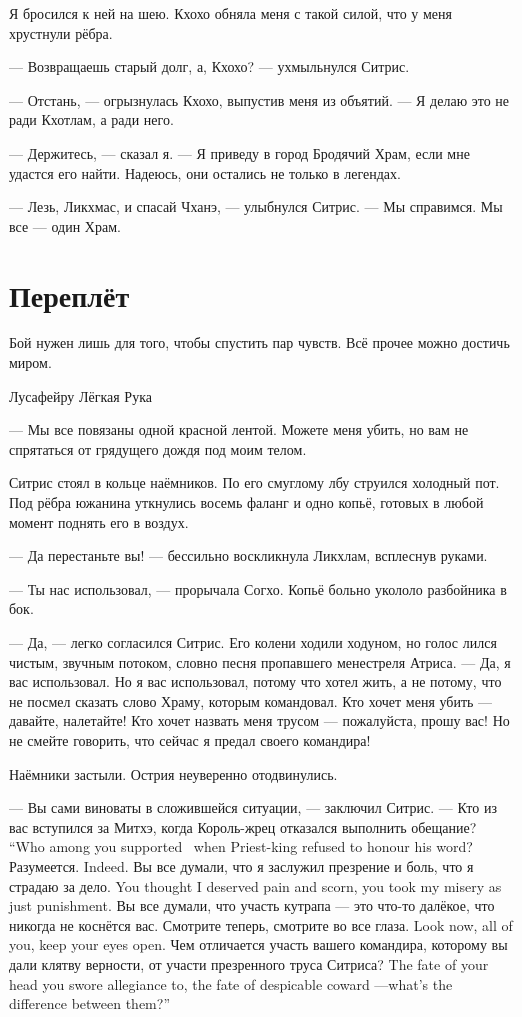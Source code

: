 Я бросился к ней на шею.
Кхохо обняла меня с такой силой, что у меня хрустнули рёбра.

--- Возвращаешь старый долг, а, Кхохо? --- ухмыльнулся Ситрис.

--- Отстань, --- огрызнулась Кхохо, выпустив меня из объятий.
--- Я делаю это не ради Кхотлам, а ради него.

--- Держитесь, --- сказал я.
--- Я приведу в город Бродячий Храм, если мне удастся его найти.
Надеюсь, они остались не только в легендах.

--- Лезь, Ликхмас, и спасай Чханэ, --- улыбнулся Ситрис.
--- Мы справимся.
Мы все --- один Храм.

\section{Переплёт}

\epigraph
{Бой нужен лишь для того, чтобы спустить пар чувств.
Всё прочее можно достичь миром.}
{Лусафейру Лёгкая Рука}

--- Мы все повязаны одной красной лентой.
Можете меня убить, но вам не спрятаться от грядущего дождя под моим телом.

Ситрис стоял в кольце наёмников.
По его смуглому лбу струился холодный пот.
Под рёбра южанина уткнулись восемь фаланг и одно копьё, готовых в любой момент поднять его в воздух.

--- Да перестаньте вы! --- бессильно воскликнула Ликхлам, всплеснув руками.

--- Ты нас использовал, --- прорычала Согхо.
Копьё больно укололо разбойника в бок.

--- Да, --- легко согласился Ситрис.
Его колени ходили ходуном, но голос лился чистым, звучным потоком, словно песня пропавшего менестреля Атриса.
--- Да, я вас использовал.
Но я вас использовал, потому что хотел жить, а не потому, что не посмел сказать слово Храму, которым командовал.
Кто хочет меня убить --- давайте, налетайте!
Кто хочет назвать меня трусом --- пожалуйста, прошу вас!
Но не смейте говорить, что сейчас я предал своего командира!

Наёмники застыли.
Острия неуверенно отодвинулись.

--- Вы сами виноваты в сложившейся ситуации, --- заключил Ситрис.
{--- Кто из вас вступился за Митхэ, когда Король-жрец отказался выполнить обещание?}
{``Who among you supported \Mitchoe\ when Priest-king refused to honour his word?}
{Разумеется.}
{Indeed.}
{Вы все думали, что я заслужил презрение и боль, что я страдаю за дело.}
{You thought I deserved pain and scorn, you took my misery as just punishment.}
Вы все думали, что участь кутрапа --- это что-то далёкое, что никогда не коснётся вас.
{Смотрите теперь, смотрите во все глаза.}
{Look now, all of you, keep your eyes open.}
{Чем отличается участь вашего командира, которому вы дали клятву верности, от участи презренного труса Ситриса?}
{The fate of your head you swore allegiance to, the fate of despicable coward \Sitris---what's the difference between them?''}

